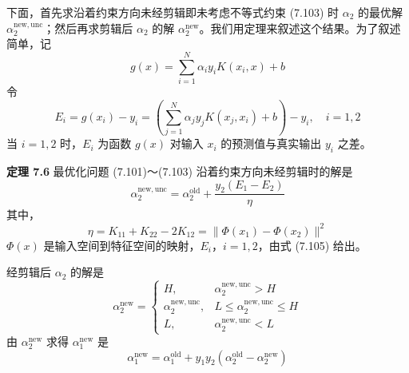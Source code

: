 \documentclass[UTF8, 12pt, fontset=fandol, oneside]{ctexart}
\begin{document}
下面，首先求沿着约束方向未经剪辑即未考虑不等式约束 (7.103) 时 $\alpha_2$ 的最优解 $\alpha_2^{\mathrm{new,unc}}$；然后再求剪辑后 $\alpha_2$ 的解 $\alpha_2^{\mathrm{new}}$。我们用定理来叙述这个结果。为了叙述简单，记
\begin{equation}
g(x)=\sum_{i=1}^N\alpha_i y_iK(x_i,x)+b
\tag{7.104}
\end{equation}
令
\begin{equation}
E_i=g(x_i)-y_i=\left(\sum_{j=1}^N\alpha_jy_jK(x_j,x_i)+b\right)-y_i,\quad i=1,2
\tag{7.105}
\end{equation}
当 $i=1,2$ 时，$E_i$ 为函数 $g(x)$ 对输入 $x_i$ 的预测值与真实输出 $y_i$ 之差。

\noindent\textbf{定理 7.6}\quad
最优化问题 (7.101)～(7.103) 沿着约束方向未经剪辑时的解是
\begin{equation}
\alpha_2^{\mathrm{new,unc}}=\alpha_2^{\mathrm{old}}+\frac{y_2(E_1-E_2)}{\eta}
\tag{7.106}
\end{equation}
其中，
\begin{equation}
\eta=K_{11}+K_{22}-2K_{12}=\|\Phi(x_1)-\Phi(x_2)\|^2
\tag{7.107}
\end{equation}
$\Phi(x)$ 是输入空间到特征空间的映射，$E_i$，$i=1,2$，由式 (7.105) 给出。

经剪辑后 $\alpha_2$ 的解是
\begin{equation}
\alpha_2^{\mathrm{new}}=
\begin{cases}
H,& \alpha_2^{\mathrm{new,unc}}>H\\
\alpha_2^{\mathrm{new,unc}},& L\leq\alpha_2^{\mathrm{new,unc}}\leq H\\
L,& \alpha_2^{\mathrm{new,unc}}<L
\end{cases}
\tag{7.108}
\end{equation}
由 $\alpha_2^{\mathrm{new}}$ 求得 $\alpha_1^{\mathrm{new}}$ 是
\begin{equation}
\alpha_1^{\mathrm{new}}=\alpha_1^{\mathrm{old}}+y_1y_2(\alpha_2^{\mathrm{old}}-\alpha_2^{\mathrm{new}})
\tag{7.109}
\end{equation}
\end{document}
